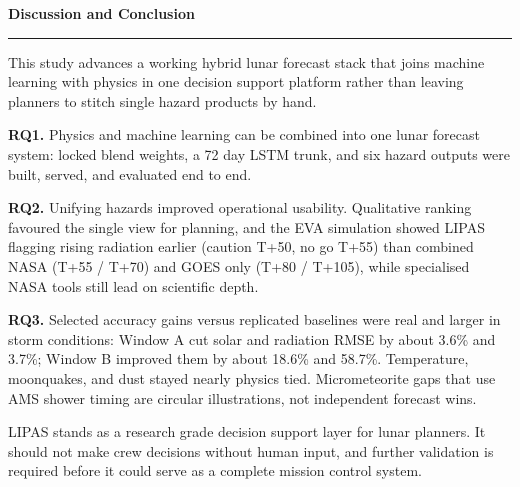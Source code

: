 \documentclass[12pt]{article}
\newcommand{\SectionSize}{30pt}
\newcommand{\OuterPad}{14mm}
\newcommand{\InnerWidth}{\dimexpr\paperwidth-2\OuterPad\relax}
\newcommand{\ColW}{0.492\InnerWidth}
\newcommand{\ColHeight}{1070mm}
\newcommand{\SectionTitle}[1]{%
  \vspace{1.5mm}%
  {\bfseries\fontsize{\SectionSize}{34pt}\selectfont\color{LipasTeal}#1\par}%
  {\color{LipasTeal}\rule{0.55\linewidth}{1.3pt}\par}%
  \vspace{1.2mm}%
}
\begin{document}
\begin{minipage}{\InnerWidth}
\begin{minipage}[t][\ColHeight][t]{\ColW}
\vspace{4mm}
\SectionTitle{Discussion and Conclusion}
This study advances a working hybrid lunar forecast stack that joins machine learning with physics in one decision support platform rather than leaving planners to stitch single hazard products by hand.

\vspace{1.4mm}
\noindent\textbf{RQ1.} Physics and machine learning can be combined into one lunar forecast system: locked blend weights, a 72 day LSTM trunk, and six hazard outputs were built, served, and evaluated end to end.

\vspace{1.4mm}
\noindent\textbf{RQ2.} Unifying hazards improved operational usability. Qualitative ranking favoured the single view for planning, and the EVA simulation showed LIPAS flagging rising radiation earlier (caution T+50, no go T+55) than combined NASA (T+55 / T+70) and GOES only (T+80 / T+105), while specialised NASA tools still lead on scientific depth.

\vspace{1.4mm}
\noindent\textbf{RQ3.} Selected accuracy gains versus replicated baselines were real and larger in storm conditions: Window A cut solar and radiation RMSE by about 3.6\% and 3.7\%; Window B improved them by about 18.6\% and 58.7\%. Temperature, moonquakes, and dust stayed nearly physics tied. Micrometeorite gaps that use AMS shower timing are circular illustrations, not independent forecast wins.

\vspace{1.6mm}
LIPAS stands as a research grade decision support layer for lunar planners. It should not make crew decisions without human input, and further validation is required before it could serve as a complete mission control system.
\end{minipage}

\vspace{2mm}


\end{minipage}
\end{document}
